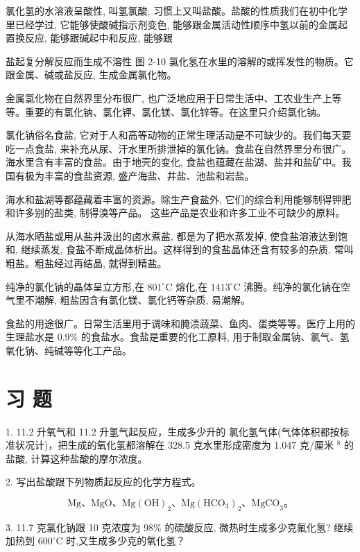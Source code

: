 \documentclass[10pt]{article}
\begin{document}
氯化氢的水溶液呈酸性, 叫氢氯酸, 习惯上又叫盐酸。盐酸的性质我们在初中化学里已经学过, 它能够使酸碱指示剂变色, 能够跟金属活动性顺序中氢以前的金属起置换反应, 能够跟碱起中和反应, 能够跟

盐起复分解反应而生成不溶性 图 2-10 氯化氢在水里的溶解的或挥发性的物质。它跟金属、碱或盐反应, 生成金属氯化物。

金属氯化物在自然界里分布很广, 也广泛地应用于日常生活中、工农业生产上等等。重要的有氯化钠、氯化钾、氯化镁、氯化锌等。在这里只介绍氯化钠。

氯化钠俗名食盐, 它对于人和高等动物的正常生理活动是不可缺少的。我们每天要吃一点食盐, 来补充从尿、汗水里所排泄掉的氯化钠。食盐在自然界里分布很广。海水里含有丰富的食盐。由于地壳的变化, 食盐也蕴藏在盐湖、盐井和盐矿中。我国有极为丰富的食盐资源, 盛产海盐、井盐、池盐和岩盐。

海水和盐湖等都蕴藏着丰富的资源。除生产食盐外, 它们的综合利用能够制得钾肥和许多别的盐类, 制得溴等产品。 这些产品是农业和许多工业不可缺少的原料。

从海水晒盐或用从盐井汲出的卤水煮盐, 都是为了把水蒸发掉, 使食盐溶液达到饱和, 继续蒸发, 食盐不断成晶体析出。这样得到的食盐晶体还含有较多的杂质, 常叫粗盐。粗盐经过再结晶, 就得到精盐。

纯净的氯化钠的晶体呈立方形,在 \({801}^{ \circ }\mathrm{C}\) 熔化,在 \({1413}^{ \circ }\mathrm{C}\) 沸腾。纯净的氯化钠在空气里不潮解, 粗盐因含有氯化镁、氯化钙等杂质, 易潮解。

食盐的用途很广。日常生活里用于调味和腌渍蔬菜、鱼肉、蛋类等等。医疗上用的生理盐水是 \({0.9}\%\) 的食盐水。食盐是重要的化工原料, 用于制取金属钠、氯气、氢氧化钠、纯碱等等化工产品。

\section*{习 题}

1. 11.2 升氧气和 11.2 升氢气起反应，生成多少升的 氯化氢气体(气体体积都按标准状况计)，把生成的氧化氢都溶解在 328.5 克水里形成密度为 1.047 克/厘米 \({}^{8}\) 的盐酸, 计算这种盐酸的摩尔浓度。

2. 写出盐酸跟下列物质起反应的化学方程式。

\[
\mathrm{{Mg}}\text{、}\mathrm{{MgO}}\text{、}\mathrm{{Mg}}{\left( \mathrm{{OH}}\right) }_{2}\text{、}\mathrm{{Mg}}{\left( {\mathrm{{HCO}}}_{3}\right) }_{2}\text{、}{\mathrm{{MgCO}}}_{3}\text{。}
\]

3. 11.7 克氯化钠跟 10 克浓度为 \({98}\%\) 的硫酸反应, 微热时生成多少克氟化氢? 继续加热到 \({600}^{ \circ }\mathrm{C}\) 时,又生成多少克的氧化氢？
\end{document}
